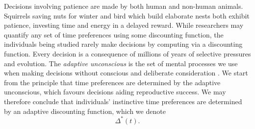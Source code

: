 \documentclass[titlepage, hidelinks, 12pt]{article}
\theoremstyle{plain}
\theoremstyle{remark}
\theoremstyle{definition}
\DeclareMathOperator{\hyp}{hyp}
\begin{document}
%        

Decisions involving patience are made by both human and non-human animals. Squirrels saving nuts for winter and bird which build elaborate nests
both exhibit patience, investing time and energy in a delayed reward. While researchers may quantify any set of time preferences using
some discounting function, the individuals being studied rarely make decisions by computing via a discounting function. 
Every decision is a consequence of millions of years of selective pressures and evolution. The \textit{adaptive unconscious} is 
the set of mental processes we use when making decisions without conscious and deliberate consideration \cite{wegner02}. We start from the principle
that time preferences are determined by the adaptive unconscious,
which favours decisions aiding reproductive success. 
We may therefore conclude that individuals' instinctive time preferences are determined by an adaptive discounting function, which we denote
\begin{equation}
    \Delta^*(t).
    \label{eqn:adaptive_discounting}
\end{equation}
\end{document}

